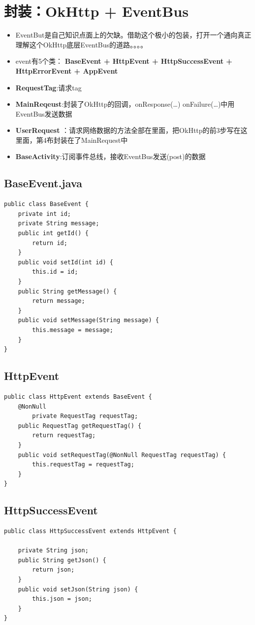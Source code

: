 \documentclass[9pt, b5paper]{article}
\begin{document}
\section{封装：OkHttp + EventBus}
\label{sec-4}
\begin{itemize}
\item EventBut是自己知识点面上的欠缺。借助这个极小的包装，打开一个通向真正理解这个OkHttp底层EventBus的道路。。。。
\item event有5个类： \textbf{BaseEvent + HttpEvent + HttpSuccessEvent + HttpErrorEvent + AppEvent}
\item \textbf{RequestTag}:请求tag
\item \textbf{MainReqeust}:封装了OkHttp的回调，onResponse(\ldots{}) onFailure(\ldots{})中用EventBus发送数据
\item \textbf{UserRequest} ：请求网络数据的方法全部在里面，把OkHttp的前3步写在这里面，第4布封装在了MainRequest中
\item \textbf{BaseActivity}:订阅事件总线，接收EventBus发送(post)的数据
\end{itemize}
\subsection{BaseEvent.java}
\label{sec-4-1}
\begin{verbatim}
public class BaseEvent {
    private int id;
    private String message;
    public int getId() {
        return id;
    }
    public void setId(int id) {
        this.id = id;
    }
    public String getMessage() {
        return message;
    }
    public void setMessage(String message) {
        this.message = message;
    }
}
\end{verbatim}
\subsection{HttpEvent}
\label{sec-4-2}
\begin{verbatim}
public class HttpEvent extends BaseEvent {
    @NonNull
        private RequestTag requestTag;
    public RequestTag getRequestTag() {
        return requestTag;
    }
    public void setRequestTag(@NonNull RequestTag requestTag) {
        this.requestTag = requestTag;
    }
}
\end{verbatim}
\subsection{HttpSuccessEvent}
\label{sec-4-3}
\begin{verbatim}
public class HttpSuccessEvent extends HttpEvent {
    
    private String json;
    public String getJson() {
        return json;
    }
    public void setJson(String json) {
        this.json = json;
    }
}
\end{verbatim}
\end{document}
